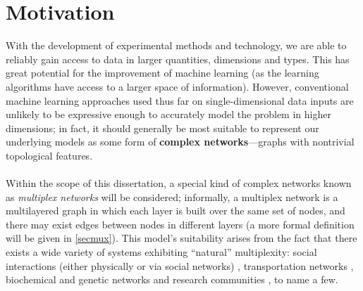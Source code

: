 \documentclass[12pt,a4paper,twoside,openright]{report}
\begin{document}
\section{Motivation}

With the development of experimental methods and technology, we are able to reliably gain access to data in larger quantities, dimensions and types. This has great potential for the improvement of machine learning (as the learning algorithms have access to a larger space of information). However, conventional machine learning approaches used thus far on single-dimensional data inputs are unlikely to be expressive enough to accurately model the problem in higher dimensions; in fact, it should generally be most suitable to represent our underlying models as some form of {\bf complex networks}---graphs with nontrivial topological features.\\ \\
Within the scope of this dissertation, a special kind of complex networks known as \emph{multiplex networks} will be considered; informally, a multiplex network is a multilayered graph in which each layer is built over the same set of nodes, and there may exist edges between nodes in different layers (a more formal definition will be given in \cref{secmux}). This model's suitability arises from the fact that there exists a wide variety of systems exhibiting ``natural'' multiplexity: social interactions (either physically or via social networks) \cite{de2013anatomy, krackhardt1987cognitive, magnani2013combinatorial, padgett1993robust}, transportation networks \cite{cardillo2013emergence, de2014navigability}, biochemical and genetic networks \cite{stark2006biogrid} and research communities \cite{de2014identifying}, to name a few.\\ \\
\end{document}
